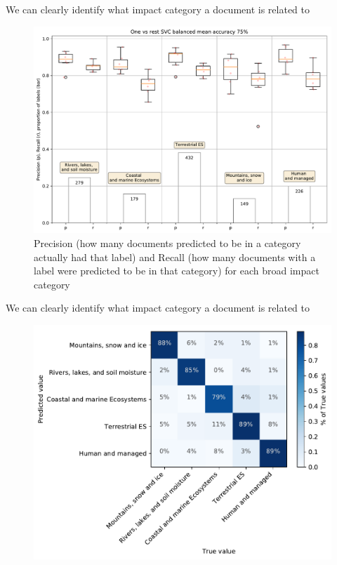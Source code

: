 \documentclass[9pt]{beamer}
\begin{document}
\begin{frame}{We can clearly identify what impact category a document is related to}

\begin{figure}
	\includegraphics[width=0.9\linewidth]{../plots/progress/cats_prediction.pdf}
	\caption{Precision (how many documents predicted to be in a category actually had that label) and Recall (how many documents with a label were predicted to be in that category) for each broad impact category}
\end{figure}

\end{frame}

\begin{frame}{We can clearly identify what impact category a document is related to}

\begin{figure}
	\includegraphics[width=0.9\linewidth]{../plots/prediction_models/category_confusion.pdf}
\end{figure}

\end{frame}
\end{document}
